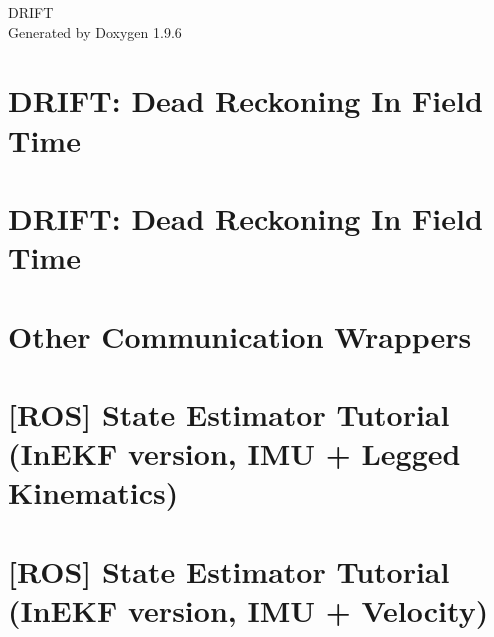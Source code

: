 \documentclass[twoside]{book}
\newcommand{\+}{\discretionary{\mbox{\scriptsize$\hookleftarrow$}}{}{}}
\newcommand{\clearemptydoublepage}{%
    \newpage{\pagestyle{empty}\cleardoublepage}%
  }
\begin{document}
  \raggedbottom
    \hypersetup{pageanchor=false,
                bookmarksnumbered=true,
                pdfencoding=unicode
               }
  \begin{titlepage}
  \vspace*{7cm}
  \begin{center}%
  {\Large DRIFT}\\
  \vspace*{1cm}
  {\large Generated by Doxygen 1.9.6}\\
  \end{center}
  \end{titlepage}
  \clearemptydoublepage
  \tableofcontents
  \clearemptydoublepage
  \hypersetup{pageanchor=true}
\chapter{DRIFT\+: Dead Reckoning In Field Time}
\label{index}\hypertarget{index}{}
\chapter{DRIFT\+: Dead Reckoning In Field Time}
\label{md__home_neofelis_VRX_drift_README}

\chapter{Other Communication Wrappers}
\label{md__home_neofelis_VRX_drift_doc_tutorials_tutorial_communication_wrapper}

\chapter{\mbox{[}ROS\mbox{]} State Estimator Tutorial (In\+EKF version, IMU + Legged Kinematics)}
\label{md__home_neofelis_VRX_drift_doc_tutorials_tutorial_inekf_imu_and_legged_kin_ros}

\chapter{\mbox{[}ROS\mbox{]} State Estimator Tutorial (In\+EKF version, IMU + Velocity)}
\label{md__home_neofelis_VRX_drift_doc_tutorials_tutorial_inekf_imu_and_vel_ros}

\end{document}
